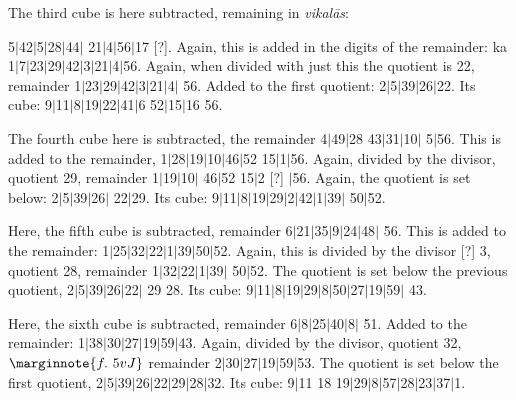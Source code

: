 \documentclass[12pt]{book}
\def\vikalas{\textit{vi\-ka\-l\=as}}
\def\danda{$|$}
\begin{document}
The third cube is here subtracted, remaining in \vikalas: 

5\danda 42\danda 5\danda 28\danda 44\danda
21\danda 4\danda 56\danda 17 [?]. Again, this is added in the digits of the remainder: ka
1\danda 7\danda 23\danda 29\danda 42\danda 3\danda 21\danda 4\danda 56. Again, when divided with
just this the quotient is 22, remainder 1\danda 23\danda 29\danda 42\danda 3\danda 21\danda 4\danda
56.  Added to the first quotient: 2\danda 5\danda 39\danda 26\danda 22. Its cube:
9\danda 11\danda 8\danda 19\danda 22\danda 41\danda 6 52\danda 15\danda 16 56.

The fourth cube here is subtracted, the remainder 4\danda 49\danda 28 43\danda 31\danda 10\danda
5\danda 56. This is added to the remainder, 1\danda 28\danda 19\danda 10\danda 46\danda 52
15\danda 1\danda 56. Again, divided by the divisor, quotient 29, remainder 1\danda 19\danda 10\danda
46\danda 52 15\danda 2 [?] \danda 56. Again, the quotient is set below: 2\danda 5\danda 39\danda 26\danda
22\danda 29. Its cube: 9\danda 11\danda 8\danda 19\danda 29\danda 2\danda 42\danda 1\danda 39\danda
50\danda 52. 

Here, the fifth cube is subtracted, remainder 6\danda 21\danda 35\danda 9\danda 24\danda 48\danda
56. This is added to the remainder: 1\danda 25\danda 32\danda 22\danda 1\danda 39\danda 50\danda 52.
Again, this is divided by the divisor [?] 3, quotient 28, remainder 1\danda 32\danda 22\danda 1\danda 39\danda
50\danda 52. The quotient is set below the previous quotient, 2\danda 5\danda 39\danda 26\danda 22\danda
29 28. Its cube: 9\danda 11\danda 8\danda 19\danda 29\danda 8\danda 50\danda 27\danda 19\danda 59\danda
43. 

Here, the sixth cube is subtracted, remainder 6\danda 8\danda 25\danda 40\danda 8\danda
51. Added to the remainder: 1\danda 38\danda 30\danda 27\danda 19\danda 59\danda 43. Again, divided 
by the divisor, quotient 32,
$\marginnote{f.~5v J}$
remainder 2\danda 30\danda 27\danda 19\danda 59\danda 53. The quotient is set below the first
quotient, 2\danda 5\danda 39\danda 26\danda 22\danda 29\danda 28\danda 32. Its cube: 
9\danda 11 18 19\danda 29\danda 8\danda 57\danda 28\danda 23\danda 37\danda 1.

\newpage
\end{document}

